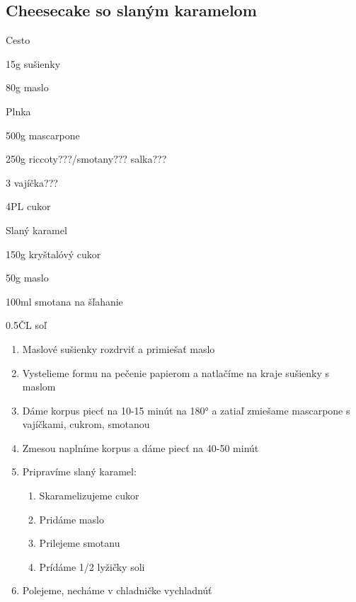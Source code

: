 \setcounter{step}{0}
\subsection{Cheesecake so slaným karamelom}

\begin{ingredient}
\def\portions{4}%

\begin{main}
	\item 
\end{main}
\begin{subingredient}{Cesto}
	\item 15g sušienky
	\item 80g maslo
\end{subingredient}
\begin{subingredient}{Plnka}
	\item 500g mascarpone
	\item 250g riccoty???/smotany??? salka???
	\item 3 vajíčka???
	\item 4PL cukor
\end{subingredient}
\begin{subingredient}{Slaný karamel}
	\item 150g kryštalóvý cukor
	\item 50g maslo
	\item 100ml smotana na šľahanie
	\item 0.5ČL soľ 	
\end{subingredient}

\end{ingredient}
\begin{recipe}

\begin{enumerate}

\item{Maslové sušienky rozdrviť a primiešať maslo}
\item{Vystelieme formu na pečenie papierom a natlačíme na kraje sušienky s maslom}
\item{Dáme korpus piecť na 10-15 minút na 180° a zatiaľ zmiešame mascarpone s vajíčkami, cukrom, smotanou}	
\item{Zmesou naplníme korpus a dáme piecť na 40-50 minút}
\item{Pripravíme slaný karamel:}
\begin{enumerate}
\item{Skaramelizujeme cukor}
\item{Pridáme maslo}
\item{Prilejeme smotanu}
\item{Prídáme 1/2 lyžičky soli}
\end{enumerate}
\item{Polejeme, necháme v chladničke vychladnúť}

\end{enumerate}
\end{recipe}

\begin{notes}

\end{notes}
\clearpage	
